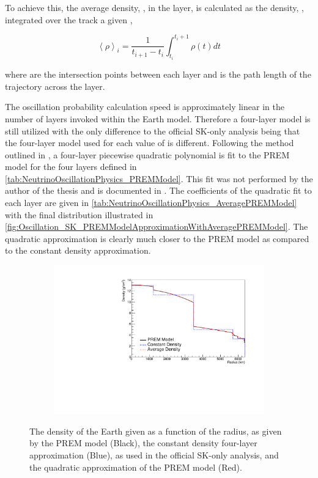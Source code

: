 To achieve this, the average density, , in the  layer, is calculated as the density, , integrated over the track a given ,

\begin{equation}
  \left< \rho \right>_{i} = \frac{1}{t_{i+1}-t_{i}} \int^{t_{i}+1}_{t_{i}} \rho(t) dt
\end{equation}

where  are the intersection points between each layer and  is the path length of the trajectory across the layer.

The oscillation probability calculation speed is approximately linear in the number of layers invoked within the Earth model. Therefore a four-layer model is still utilized with the only difference to the official SK-only analysis being that the four-layer model used for each value of  is different. Following the method outlined in \cite{EarthGrav}, a four-layer piecewise quadratic polynomial is fit to the PREM model for the four layers defined in \autoref{tab:NeutrinoOscillationPhysics_PREMModel}. This fit was not performed by the author of the thesis and is documented in \cite{t2k_tn_425}. The coefficients of the quadratic fit to each layer are given in \autoref{tab:NeutrinoOscillationPhysics_AveragePREMModel} with the final distribution illustrated in \autoref{fig:Oscillation_SK_PREMModelApproximationWithAveragePREMModel}. The quadratic approximation is clearly much closer to the PREM model as compared to the constant density approximation. 

\begin{figure}[h]
  \begin{subfigure}[t]{0.8\textwidth}
    \includegraphics[width=\textwidth, trim={0mm 0mm 0mm 0mm}, clip,page=1]{Figures/Oscillation/DensityComparisonWithAveragePREM.pdf}
  \end{subfigure}
  \caption{The density of the Earth given as a function of the radius, as given by the PREM model (Black), the constant density four-layer approximation (Blue), as used in the official SK-only analysis, and the quadratic approximation of the PREM model (Red).}
  \label{fig:Oscillation_SK_PREMModelApproximationWithAveragePREMModel}
\end{figure}

